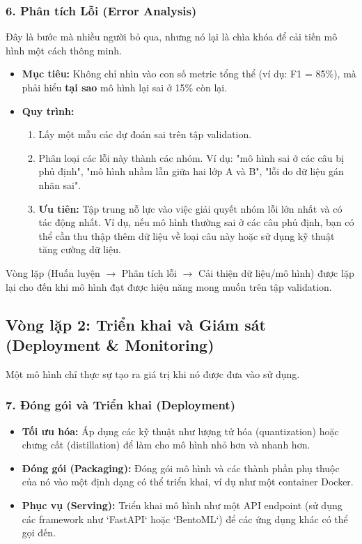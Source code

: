 \subsubsection{6. Phân tích Lỗi (Error Analysis)}
Đây là bước mà nhiều người bỏ qua, nhưng nó lại là chìa khóa để cải tiến mô hình một cách thông minh.
\begin{itemize}
    \item \textbf{Mục tiêu:} Không chỉ nhìn vào con số metric tổng thể (ví dụ: F1 = 85\%), mà phải hiểu \textbf{tại sao} mô hình lại sai ở 15\% còn lại.
    \item \textbf{Quy trình:}
        \begin{enumerate}
            \item Lấy một mẫu các dự đoán sai trên tập validation.
            \item Phân loại các lỗi này thành các nhóm. Ví dụ: "mô hình sai ở các câu bị phủ định", "mô hình nhầm lẫn giữa hai lớp A và B", "lỗi do dữ liệu gán nhãn sai".
            \item \textbf{Ưu tiên:} Tập trung nỗ lực vào việc giải quyết nhóm lỗi lớn nhất và có tác động nhất. Ví dụ, nếu mô hình thường sai ở các câu phủ định, bạn có thể cần thu thập thêm dữ liệu về loại câu này hoặc sử dụng kỹ thuật tăng cường dữ liệu.
        \end{enumerate}
\end{itemize}
Vòng lặp (Huấn luyện $\rightarrow$ Phân tích lỗi $\rightarrow$ Cải thiện dữ liệu/mô hình) được lặp lại cho đến khi mô hình đạt được hiệu năng mong muốn trên tập validation.

\subsection{Vòng lặp 2: Triển khai và Giám sát (Deployment \& Monitoring)}
\label{ssec:workflow_step2}
Một mô hình chỉ thực sự tạo ra giá trị khi nó được đưa vào sử dụng.

\subsubsection{7. Đóng gói và Triển khai (Deployment)}
\begin{itemize}
    \item \textbf{Tối ưu hóa:} Áp dụng các kỹ thuật như lượng tử hóa (quantization) hoặc chưng cất (distillation) để làm cho mô hình nhỏ hơn và nhanh hơn.
    \item \textbf{Đóng gói (Packaging):} Đóng gói mô hình và các thành phần phụ thuộc của nó vào một định dạng có thể triển khai, ví dụ như một container Docker.
    \item \textbf{Phục vụ (Serving):} Triển khai mô hình như một API endpoint (sử dụng các framework như `FastAPI` hoặc `BentoML`) để các ứng dụng khác có thể gọi đến.
\end{itemize}

